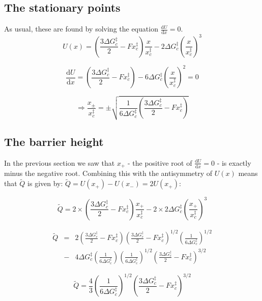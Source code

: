 \documentclass[twocolumn,pre,aps,showpacs,a4paper,floatfix,amssymb]{revtex4-1}
\begin{document}
\subsection{The stationary points}
As usual, these are found by solving the equation $\frac{\text{d}U}{\text{d}x} = 0$.
\begin{equation}
U(x) = \left(\frac{3\Delta G_c^\ddagger}{2} - Fx_c^\ddagger \right)\frac{x}{x_c^\ddagger} - 2\Delta G_c^\ddagger \left(\frac{x}{x_c^\ddagger}\right)^3
\end{equation}

\begin{equation}
\frac{\text{d}U}{\text{d}x} = \left(\frac{3\Delta G_c^\ddagger}{2} - Fx_c^\ddagger \right) - 6\Delta G_c^\ddagger \left(\frac{x}{x_c^\ddagger}\right)^2 = 0
\end{equation}

\begin{equation}
\Rightarrow \frac{x_\pm}{x_c^\ddagger} = \pm \sqrt{\frac{1}{6\Delta G_c^\ddagger}\left(\frac{3\Delta G_c^\ddagger}{2} - Fx_c^\ddagger \right)}
\end{equation}

\subsection{The barrier height}
In the previous section we saw that $x_+$ - the positive root of $\frac{\text{d}U}{\text{d}x} = 0$ - is exactly minus the negative root. Combining this with the antisymmetry of $U(x)$ means that $\tilde{Q}$ is given by: $\tilde{Q} = U(x_+) - U(x_-) = 2U(x_+)$:

\begin{equation}
\tilde{Q} = 2 \times \left(\frac{3\Delta G_c^\ddagger}{2} - Fx_c^\ddagger \right) \frac{x_+}{x_c^\ddagger} - 2 \times 2\Delta G_c^\ddagger \left(\frac{x_+}{x_c^\ddagger}\right)^3
\end{equation}

\begin{eqnarray}
\tilde{Q} &=& 2\left(\frac{3\Delta G_c^\ddagger}{2} - Fx_c^\ddagger \right)\left(\frac{3\Delta G_c^\ddagger}{2} - Fx_c^\ddagger \right)^{1/2} \left(\frac{1}{6\Delta G_c^\ddagger}\right)^{1/2} \nonumber \\
&-& 4\Delta G_c^\ddagger \left(\frac{1}{6\Delta G_c^\ddagger}\right)\left(\frac{1}{6\Delta G_c^\ddagger}\right)^{1/2}\left(\frac{3\Delta G_c^\ddagger}{2} - Fx_c^\ddagger \right)^{3/2}
\end{eqnarray}

\begin{equation}
\tilde{Q} = \frac{4}{3}\left(\frac{1}{6\Delta G_c^\ddagger}\right)^{1/2} \left(\frac{3\Delta G_c^\ddagger}{2} - Fx_c^\ddagger \right)^{3/2}
\end{equation}
\end{document}
